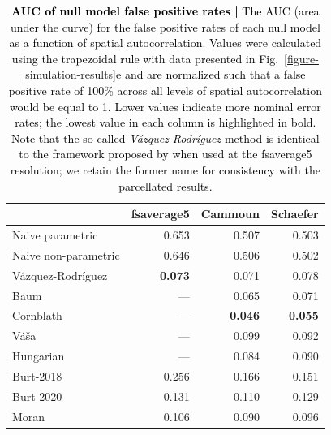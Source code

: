 \documentclass[12pt,aps,pra,reprint,showkeys]{revtex4-1}
\newcommand{\nimg}[1]{\textcolor{black}{{#1}}}
\begin{document}
\begin{table}
  \begin{minipage}[c][\textheight][c]{\textwidth}
    \caption{
      \nimg{\textbf{AUC of null model false positive rates | }
      The AUC (area under the curve) for the false positive rates of each null model as a function of spatial autocorrelation.
      Values were calculated using the trapezoidal rule with data presented in Fig.~\ref{figure-simulation-results}e and are normalized such that a false positive rate of 100\% across all levels of spatial autocorrelation would be equal to 1.
      Lower values indicate more nominal error rates; the lowest value in each column is highlighted in bold.
      Note that the so-called \textit{V{\'a}zquez-Rodr{\'i}guez} method is identical to the framework proposed by \citet{alexanderbloch2018neuroimage} when used at the fsaverage5 resolution; we retain the former name for consistency with the parcellated results.}
    }
    \label{supp-table-sim-auc}
    \setlength{\tabcolsep}{7pt}
    \renewcommand{\arraystretch}{1.25}
    \begin{center}
      \begin{tabular}{l r r r}
                                                                                       \toprule
                       & \textbf{fsaverage5} & \textbf{Cammoun} & \textbf{Schaefer} \\ \toprule
        Naive parametric          &          0.653 &          0.507 &         0.503 \\
        Naive non-parametric      &          0.646 &          0.506 &         0.502 \\
        V{\'a}zquez-Rodr{\'i}guez & \textbf{0.073} &          0.071 &         0.078 \\
        Baum                      &            --- &          0.065 &         0.071 \\
        Cornblath                 &            --- & \textbf{0.046} & \textbf{0.055}\\
        V{\'a}{\v{s}}a            &            --- &          0.099 &         0.092 \\
        Hungarian                 &            --- &          0.084 &         0.090 \\
        Burt-2018                 &          0.256 &          0.166 &         0.151 \\
        Burt-2020                 &          0.131 &          0.110 &         0.129 \\
        Moran                     &          0.106 &          0.090 &         0.096 \\ \bottomrule
      \end{tabular}
    \end{center}
  \end{minipage}
\end{table}
\end{document}
